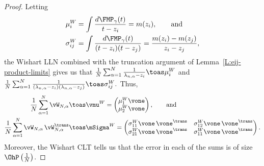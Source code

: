 \begin{proof}
    Letting
    \begin{align*}
        \mu^W_i
            &=
                \int \frac{ d\FMP_\gamma(t) }
                          { t - z_i }
            =
                m( z_i ), \qquad\text{and} \\
        \sigma^W_{ij}
            &=
                \int \frac{ d\FMP_\gamma(t) }
                          { (t - z_i)(t - z_j) }
            =
                \frac{ m( z_i ) - m( z_j ) }
                     { z_i - z_j },
    \end{align*}
    the Wishart LLN combined with the truncation argument of
    Lemma~\ref{L:eij-product-limits} gives us that
    \(
        \frac{1}{N}
        \sum_{\alpha=1}^N
            \frac{1}{  \lambda_{n,\alpha} - z_i  }
            \toas
                \mu^W_{i}
    \)
    and
    \(
        \frac{1}{N}
        \sum_{\alpha=1}^N
            \frac{1}{ ( \lambda_{n,\alpha} - z_i )
                      ( \lambda_{n,\alpha} - z_j ) }
            \toas
                \sigma^W_{ij}.
    \)
    Thus,
    \begin{align*}
        \frac{1}{N}
        \sum_{\alpha=1}^N
            \vW_{N,\alpha}
            &\toas
                \vmu^W =
                \left(
                \begin{matrix}
                    \mu^W_1 \vone \\
                    \mu^W_2 \vone
                \end{matrix}
                \right), \qquad\text{and} \\
        \frac{1}{N}
        \sum_{\alpha=1}^N
            \vW_{N,\alpha} \,
            \vW_{N,\alpha}^\trans
            &\toas
                \mSigma^W
            =
                \left(
                \begin{matrix}
                    \sigma^W_{11} \vone \, \vone^\trans &
                        \sigma^W_{12} \vone \, \vone^\trans \\
                    \sigma^W_{21} \vone \, \vone^\trans &
                        \sigma^W_{11} \vone \, \vone^\trans
                \end{matrix}
                \right).
    \end{align*}
    Moreover, the Wishart CLT tells us that the error in each of the
    sums is of size $\OhP\left( \frac{1}{N} \right)$.  
        

\end{proof}
